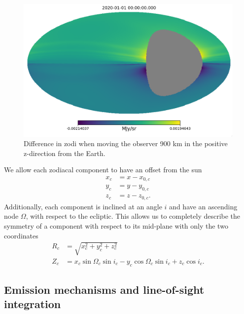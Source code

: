 \documentclass{aa}
\begin{document}
\begin{figure}
    \centering
         \includegraphics[width=\linewidth]{figs/Z+900km.png}
        \caption{Difference in zodi when moving the observer 900 km in the positive z-direction from the Earth.}
      \label{fig: z}
\end{figure}


We allow each zodiacal component to have an offset from the sun
\begin{equation}
    \begin{aligned}
    x_c&= x - x_{0,c}\\
    y_c&= y - y_{0,c}\\
    z_c&= z - z_{0,c}.
    \end{aligned}
\end{equation}
Additionally, each component is inclined at an angle $i$ and have an ascending node $\Omega$, with respect to the ecliptic. This allows us to completely describe the symmetry of a component with respect to its mid-plane with only the two coordinates
\begin{align}
    R_c &= \sqrt{x_c^2 + y_c^2 + z_c^2}\\
    Z_c &= x_c\sin{\Omega_c}\sin{i_c} - y_c \cos{\Omega_c}\sin{i_c} + z_c \cos{i_c}.
\end{align}

\subsection{Emission mechanisms and line-of-sight integration}
\end{document}
